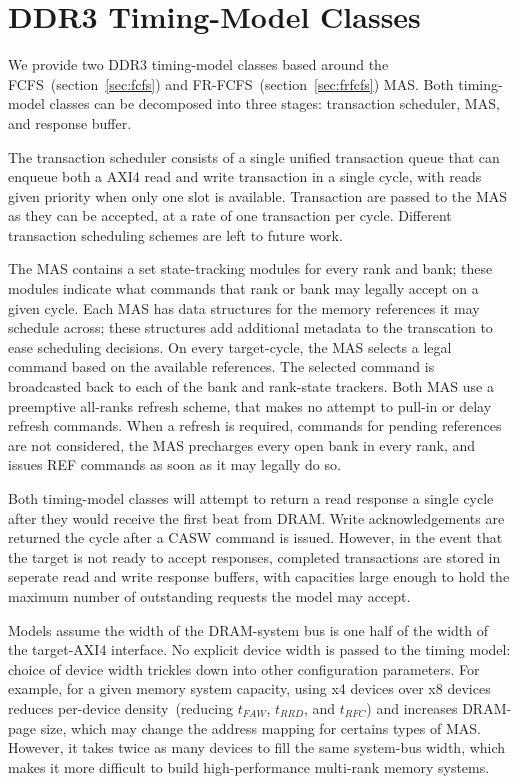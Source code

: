 \clearpage
\section{DDR3 Timing-Model Classes}

We provide two DDR3 timing-model classes based around the
FCFS~(section~\ref{sec:fcfs}) and FR-FCFS~(section~\ref{sec:frfcfs}) MAS. Both
timing-model classes can be decomposed into three stages: transaction
scheduler, MAS, and response buffer.

The transaction scheduler consists of a single unified transaction queue that
can enqueue both a AXI4 read and write transaction in a single cycle, with reads
given priority when only one slot is available. Transaction are passed to the
MAS as they can be accepted, at a rate of one transaction per cycle.  Different
transaction scheduling schemes are left to future work.

The MAS contains a set state-tracking modules for every rank and bank; these
modules indicate what commands that rank or bank may legally accept on a given
cycle. Each MAS has data structures for the memory references it may schedule
across; these structures add additional metadata to the transcation to ease
scheduling decisions. On every target-cycle, the MAS selects a legal command
based on the available references. The selected command is broadcasted back to
each of the bank and rank-state trackers.  Both MAS use a preemptive all-ranks
refresh scheme, that makes no attempt to pull-in or delay refresh commands.
When a refresh is required, commands for pending references are not considered,
the MAS precharges every open bank in every rank, and issues REF commands as
soon as it may legally do so.

Both timing-model classes will attempt to return a read response a single cycle
after they would receive the first beat from DRAM. Write acknowledgements are
returned the cycle after a CASW command is issued. However, in the event that
the target is not ready to accept responses, completed transactions are stored
in seperate read and write response buffers, with capacities large enough to
hold the maximum number of outstanding requests the model may accept.

Models assume the width of the DRAM-system bus is one half of the width of the
target-AXI4 interface. No explicit device width is passed to the timing
model: choice of device width trickles down into other configuration
parameters. For example, for a given memory system capacity, using x4 devices
over x8 devices reduces per-device density~(reducing $t_{FAW}$,
$t_{RRD}$, and $t_{RFC}$) and increases DRAM-page size, which may change the
address mapping for certains types of MAS.  However, it takes twice as many
devices to fill the same system-bus width, which makes it more difficult to
build high-performance multi-rank memory systems.

